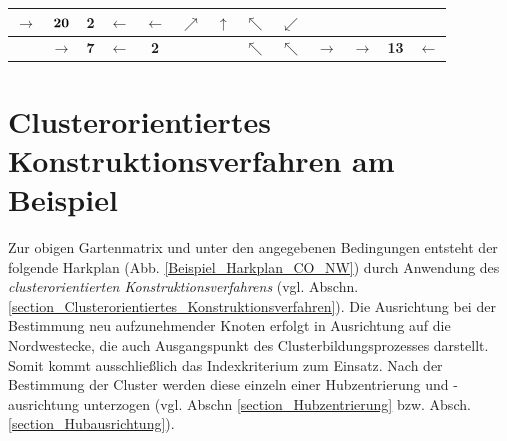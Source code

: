 \begin{center}
\begin{minipage}{\textwidth}
\begin{table}[H]
\begin{scriptsize}
\begin{tabular}{|>{}c|>{}c|>{}c|>{}c||>{}c|>{}c|>{}c|>{}c|>{}c||>{}c|>{}c|>{}c|>{}c|}
\cellcolor{blue!15!white}$\rightarrow$&$\cellcolor{blue!15!white}\bf{20}$&\cellcolor{red!15!white}\bf{2}&\cellcolor{red!15!white}$\leftarrow$&\cellcolor{red!15!white}$\leftarrow$ &\cellcolor{green!15!white}$\nearrow$&\cellcolor{green!15!white}$\uparrow$&\cellcolor{green!15!white}$\nwarrow$&\cellcolor{yellow!15!white}$\swarrow$\\
\hline
\cellcolor{gray!50!white}&\cellcolor{yellow!15!white}$\rightarrow$&\cellcolor{yellow!15!white}\bf{7}&\cellcolor{yellow!15!white}$\leftarrow$&
\cellcolor{green!15!white}\bf{2}&\cellcolor{gray!50!white}&\cellcolor{gray!50!white}&\cellcolor{red!15!white}$\nwarrow$&\cellcolor{red!15!white}$\nwarrow$& \cellcolor{yellow!15!white}$\rightarrow$&\cellcolor{yellow!15!white}$\rightarrow$&\cellcolor{yellow!15!white}\bf{13}&\cellcolor{yellow!15!white}$\leftarrow$ \\
\hline
\end{tabular}
\label{Beispiel_Gartenmatrix_Zickzack_unterteilt_Hubausrichtung}
\end{scriptsize} 
\end{table}
\renewcommand{\arraystretch}{1}
\end{minipage}
\end{center}



\section{Clusterorientiertes Konstruktionsverfahren am Beispiel} \label{Beispiel Clusterorientiertes Verfahren}

\noindent Zur obigen Gartenmatrix und unter den angegebenen Bedingungen entsteht der folgende Harkplan (Abb. \ref{Beispiel_Harkplan_CO_NW}) durch Anwendung des \textit{clusterorientierten Konstruktionsverfahrens} (vgl. Abschn. \ref{section_Clusterorientiertes_Konstruktionsverfahren}). Die Ausrichtung bei der Bestimmung neu aufzunehmender Knoten erfolgt in Ausrichtung auf die Nordwestecke, die auch Ausgangspunkt des Clusterbildungsprozesses darstellt. Somit kommt ausschließlich das Indexkriterium zum Einsatz. Nach der Bestimmung der Cluster werden diese einzeln einer Hubzentrierung und -ausrichtung unterzogen (vgl. Abschn \ref{section_Hubzentrierung} bzw. Absch. \ref{section_Hubausrichtung}). 

